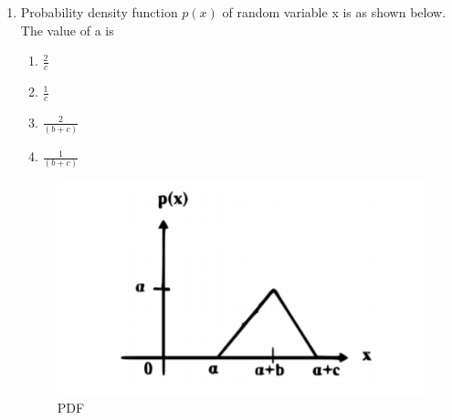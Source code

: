 \begin{enumerate}[label=\thesection.\arabic*.,ref=\thesection.\theenumi]
\item Probability density function $p(x)$ of random variable x is as shown below. The value of a is
\begin{enumerate}[label=\Alph*)]
    \item $\frac{2}{c}$
    \item $\frac{1}{c}$
    \item $\frac{2}{(b+c)}$
    \item $\frac{1}{(b+c)}$
\end{enumerate}
\begin{figure}[!ht]
\centering
\includegraphics[width=\columnwidth]{solutions/in/2006/2/figures/convolution.png}
\caption{PDF}
\label{in2006-2:fig:convolution}
\end{figure}
%
\solution



\end{enumerate}